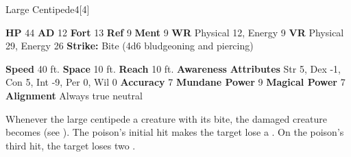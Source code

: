       
  \begin{monsubsection}{Large Centipede}{4}[4]
    \vspace{-1em}\vspace{-1em}
    \vspace{0em}

    
    

    \begin{spellcontent}
      \begin{spelltargetinginfo}
        \pari \textbf{HP} 44 \monsep
          \textbf{AD} 12 \monsep
          \textbf{Fort} 13 \monsep
          \textbf{Ref} 9 \monsep
          \textbf{Ment} 9
        \pari \textbf{WR} Physical 12, Energy 9 \monsep
        \textbf{VR} Physical 29, Energy 26
        \pari \textbf{Strike:}
            Bite  (4d6 bludgeoning and piercing)
      \end{spelltargetinginfo}
    \end{spellcontent}
    \begin{monsterfooter}
      \pari \textbf{Speed} 40 ft. \monsep
        \textbf{Space} 10 ft. \monsep
        \textbf{Reach} 10 ft.
      \pari \textbf{Awareness} 
      \pari \textbf{Attributes}
        Str 5, Dex -1,
        Con 5, Int -9,
        Per 0, Wil 0
      \pari \textbf{Accuracy} 7 \monsep
        \textbf{Mundane Power} 9 \monsep
      \textbf{Magical Power} 7
      \pari \textbf{Alignment} Always true neutral
    \end{monsterfooter}
  \end{monsubsection}
        Whenever the large centipede  a creature with its bite,
          the damaged creature becomes  (see ).
        The poison's initial hit makes the target lose a .
        On the poison's third hit, the target loses two .
  

